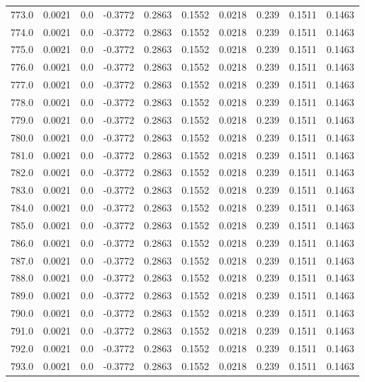\begin{longtable}{lrrrrrrrrr}
773.0 & 0.0021 & 0.0 & -0.3772 & 0.2863 & 0.1552 & 0.0218 & 0.239 & 0.1511 & 0.1463 \\
774.0 & 0.0021 & 0.0 & -0.3772 & 0.2863 & 0.1552 & 0.0218 & 0.239 & 0.1511 & 0.1463 \\
775.0 & 0.0021 & 0.0 & -0.3772 & 0.2863 & 0.1552 & 0.0218 & 0.239 & 0.1511 & 0.1463 \\
776.0 & 0.0021 & 0.0 & -0.3772 & 0.2863 & 0.1552 & 0.0218 & 0.239 & 0.1511 & 0.1463 \\
777.0 & 0.0021 & 0.0 & -0.3772 & 0.2863 & 0.1552 & 0.0218 & 0.239 & 0.1511 & 0.1463 \\
778.0 & 0.0021 & 0.0 & -0.3772 & 0.2863 & 0.1552 & 0.0218 & 0.239 & 0.1511 & 0.1463 \\
779.0 & 0.0021 & 0.0 & -0.3772 & 0.2863 & 0.1552 & 0.0218 & 0.239 & 0.1511 & 0.1463 \\
780.0 & 0.0021 & 0.0 & -0.3772 & 0.2863 & 0.1552 & 0.0218 & 0.239 & 0.1511 & 0.1463 \\
781.0 & 0.0021 & 0.0 & -0.3772 & 0.2863 & 0.1552 & 0.0218 & 0.239 & 0.1511 & 0.1463 \\
782.0 & 0.0021 & 0.0 & -0.3772 & 0.2863 & 0.1552 & 0.0218 & 0.239 & 0.1511 & 0.1463 \\
783.0 & 0.0021 & 0.0 & -0.3772 & 0.2863 & 0.1552 & 0.0218 & 0.239 & 0.1511 & 0.1463 \\
784.0 & 0.0021 & 0.0 & -0.3772 & 0.2863 & 0.1552 & 0.0218 & 0.239 & 0.1511 & 0.1463 \\
785.0 & 0.0021 & 0.0 & -0.3772 & 0.2863 & 0.1552 & 0.0218 & 0.239 & 0.1511 & 0.1463 \\
786.0 & 0.0021 & 0.0 & -0.3772 & 0.2863 & 0.1552 & 0.0218 & 0.239 & 0.1511 & 0.1463 \\
787.0 & 0.0021 & 0.0 & -0.3772 & 0.2863 & 0.1552 & 0.0218 & 0.239 & 0.1511 & 0.1463 \\
788.0 & 0.0021 & 0.0 & -0.3772 & 0.2863 & 0.1552 & 0.0218 & 0.239 & 0.1511 & 0.1463 \\
789.0 & 0.0021 & 0.0 & -0.3772 & 0.2863 & 0.1552 & 0.0218 & 0.239 & 0.1511 & 0.1463 \\
790.0 & 0.0021 & 0.0 & -0.3772 & 0.2863 & 0.1552 & 0.0218 & 0.239 & 0.1511 & 0.1463 \\
791.0 & 0.0021 & 0.0 & -0.3772 & 0.2863 & 0.1552 & 0.0218 & 0.239 & 0.1511 & 0.1463 \\
792.0 & 0.0021 & 0.0 & -0.3772 & 0.2863 & 0.1552 & 0.0218 & 0.239 & 0.1511 & 0.1463 \\
793.0 & 0.0021 & 0.0 & -0.3772 & 0.2863 & 0.1552 & 0.0218 & 0.239 & 0.1511 & 0.1463 \\

\end{longtable}
